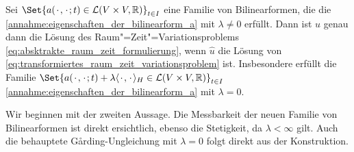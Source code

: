 \documentclass[../main.tex]{subfiles}
\begin{document}
\begin{Proposition}
\label{lemma:transformation_zu_elliptischem_operator}
    Sei $\Set{a(\blank, \blank; t) \in \mathcal L(V \times V, \mathbb{R})}_{t \in I}$ eine Familie von Bilinearformen, die die \cref{annahme:eigenschaften_der_bilinearform_a} mit $\lambda \neq 0$ erfüllt.
    Dann ist $u$ genau dann die Lösung des Raum"=Zeit"=Variationsproblems \cref{eq:absktrakte_raum_zeit_formulierung}, wenn $\hat{u}$ die Lösung von  \cref{eq:transformiertes_raum_zeit_variationsproblem} ist.
    Insbesondere erfüllt die Familie $\Set{a(\blank, \blank; t) + \lambda \skp{\blank}{\blank}{H} \in \mathcal L(V \times V, \mathbb{R})}_{t \in I}$ \cref{annahme:eigenschaften_der_bilinearform_a} mit $\lambda = 0$.

    \begin{Beweis}
        Wir beginnen mit der zweiten Aussage.
        Die Messbarkeit der neuen Familie von Bilinearformen ist direkt ersichtlich, ebenso die Stetigkeit, da $\lambda < \infty$ gilt.
        Auch die behauptete G\aa{}rding-Ungleichung mit $\lambda = 0$ folgt direkt aus der Konstruktion.


\end{Beweis}
\end{Proposition}
\end{document}

